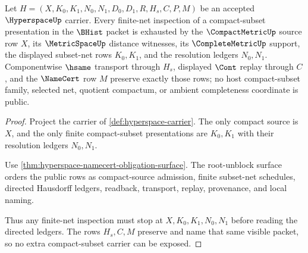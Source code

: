 \begin{theorem}
\label{thm:hyperspace-finite-net-carrier-exhaustion}
Let $H=(X,K_0,K_1,N_0,N_1,D_0,D_1,R,H_s,C,P,M)$ be an accepted $\HyperspaceUp$ carrier. Every finite-net inspection of a compact-subset presentation in the $\BHist$ packet is exhausted by the $\CompactMetricUp$ source row $X$, its $\MetricSpaceUp$ distance witnesses, its $\CompleteMetricUp$ support, the displayed subset-net rows $K_0,K_1$, and the resolution ledgers $N_0,N_1$. Componentwise $\hsame$ transport through $H_s$, displayed $\Cont$ replay through $C$, and the $\NameCert$ row $M$ preserve exactly those rows; no host compact-subset family, selected net, quotient compactum, or ambient completeness coordinate is public.
\end{theorem}
\begin{proof}
Project the carrier of \autoref{def:hyperspace-carrier}. The only compact source is $X$, and the only finite compact-subset presentations are $K_0,K_1$ with their resolution ledgers $N_0,N_1$.

Use \autoref{thm:hyperspace-namecert-obligation-surface}. The root-unblock surface orders the public rows as compact-source admission, finite subset-net schedules, directed Hausdorff ledgers, readback, transport, replay, provenance, and local naming.

Thus any finite-net inspection must stop at $X,K_0,K_1,N_0,N_1$ before reading the directed ledgers. The rows $H_s,C,M$ preserve and name that same visible packet, so no extra compact-subset carrier can be exposed.
\end{proof}

